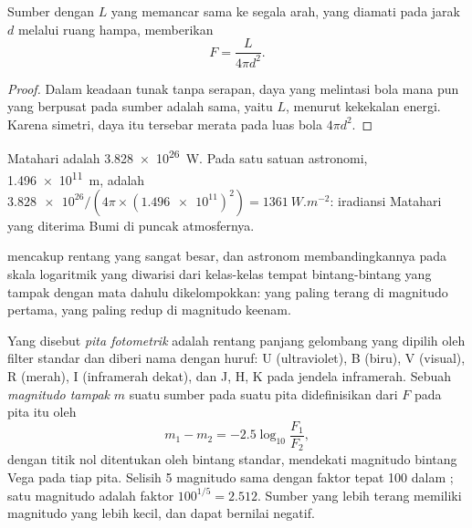\begin{proposition}\label{prop:b1:observing-the-sky:inverse-square}
Sumber dengan  $L$ yang memancar sama ke segala arah, yang diamati pada jarak $d$ melalui ruang hampa, memberikan 
\[
  F = \frac{L}{4\pi d^2} .
\]
\end{proposition}

\begin{proof}
Dalam keadaan tunak tanpa serapan, daya yang melintasi bola mana pun yang berpusat pada sumber adalah sama, yaitu $L$, menurut kekekalan energi. Karena simetri, daya itu tersebar merata pada luas bola $4\pi d^2$.
\end{proof}

\begin{example}
 Matahari adalah \qty{3.828e26}{W}. Pada satu satuan astronomi, \qty{1.496e11}{m},  adalah $\num{3.828e26}/(4\pi\times
(\num{1.496e11})^2) = \qty{1361}{W.m^{-2}}$: iradiansi Matahari yang diterima Bumi di puncak atmosfernya.
\end{example}

 mencakup rentang yang sangat besar, dan astronom membandingkannya pada skala logaritmik yang diwarisi dari kelas-kelas tempat bintang-bintang yang tampak dengan mata dahulu dikelompokkan: yang paling terang di magnitudo pertama, yang paling redup di magnitudo keenam.

\begin{definition}\label{def:b1:observing-the-sky:magnitude}
Yang disebut \emph{pita fotometrik} adalah rentang panjang gelombang yang dipilih oleh filter standar dan diberi nama dengan huruf: U (ultraviolet), B (biru), V (visual), R (merah), I (inframerah dekat), dan J, H, K pada jendela inframerah. Sebuah \emph{magnitudo tampak} $m$ suatu sumber pada suatu pita didefinisikan dari  $F$ pada pita itu oleh
\[
  m_1 - m_2 = -2.5\log_{10}\frac{F_1}{F_2} ,
\]
dengan titik nol ditentukan oleh bintang standar, mendekati magnitudo bintang Vega pada tiap pita. Selisih 5 magnitudo sama dengan faktor tepat 100 dalam ; satu magnitudo adalah faktor $100^{1/5} = 2.512$. Sumber yang lebih terang memiliki magnitudo yang lebih kecil, dan dapat bernilai negatif.
\end{definition}

